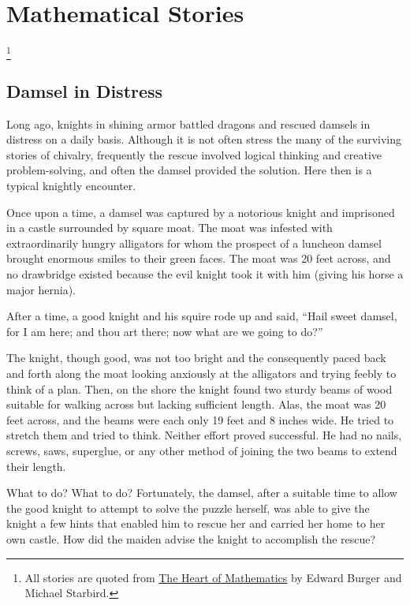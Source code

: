 \section{Mathematical Stories}\footnote{All stories are quoted from \underline{The Heart of Mathematics} by Edward Burger and Michael Starbird.}

\newif\ifnudges

\subsection{Damsel in Distress}

Long ago, knights in shining armor battled dragons and rescued damsels in distress on a daily basis. Although it is not often stress the many of the surviving stories of chivalry, frequently the rescue involved logical thinking and creative problem-solving, and often the damsel provided the solution. Here then is a typical knightly encounter.

Once upon a time, a damsel was captured by a notorious knight and imprisoned in a castle surrounded by square moat. The moat was infested with extraordinarily hungry alligators for whom the prospect of a luncheon damsel brought enormous smiles to their green faces. The moat was 20 feet across, and no drawbridge existed because the evil knight took it with him (giving his horse a major hernia).

After a time, a good knight and his squire rode up and said, ``Hail sweet damsel, for I am here; and thou art there; now what are we going to do?''

The knight, though good, was not too bright and the consequently paced back and forth along the moat looking anxiously at the alligators and trying feebly to think of a plan. Then, on the shore the knight found two sturdy beams of wood suitable for walking across but lacking sufficient length. Alas, the moat was 20 feet across, and the beams were each only 19 feet and 8 inches wide. He tried to stretch them and tried to think. Neither effort proved successful. He had no nails, screws, saws, superglue, or any other method of joining the two beams to extend their length.

What to do? What to do? Fortunately, the damsel, after a suitable time to allow the good knight to attempt to solve the puzzle herself, was able to give the knight a few hints that enabled him to rescue her and carried her home to her own castle. How did the maiden advise the knight to accomplish the rescue?

